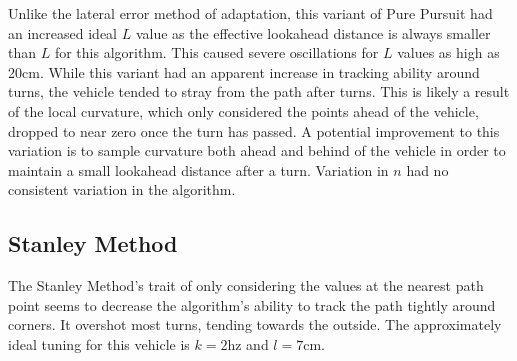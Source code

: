 \documentclass[mla8alt]{mla}
\begin{document}
\begin{paper}
\begin{figure}[H]
\endminipage
\end{figure}

Unlike the lateral error method of adaptation, this variant of Pure Pursuit had an increased ideal $L$ value as the effective lookahead distance is always smaller than $L$ for this algorithm. This caused severe oscillations for $L$ values as high as 20cm. While this variant had an apparent increase in tracking ability around turns, the vehicle tended to stray from the path after turns. This is likely a result of the local curvature, which only considered the points ahead of the vehicle, dropped to near zero once the turn has passed. A potential improvement to this variation is to sample curvature both ahead and behind of the vehicle in order to maintain a small lookahead distance after a turn. Variation in $n$ had no consistent variation in the algorithm.

\subsection{Stanley Method}

The Stanley Method's trait of only considering the values at the nearest path point seems to decrease the algorithm's ability to track the path tightly around corners. It overshot most turns, tending towards the outside. The approximately ideal tuning for this vehicle is $k=2$hz and $l=7$cm.


\end{paper}
\end{document}
